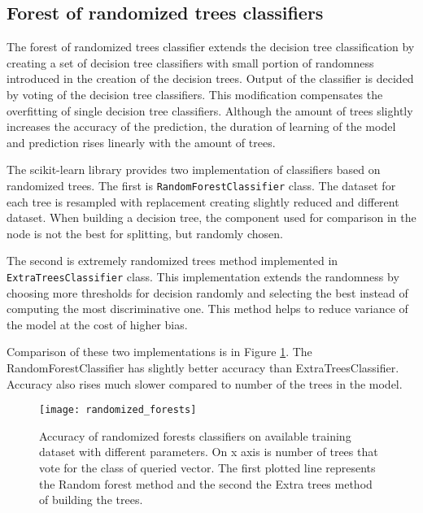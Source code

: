 \subsection{Forest of randomized trees classifiers}
The forest of randomized trees classifier extends the decision tree
classification by creating a set of decision tree classifiers with small portion
of randomness introduced in the creation of the decision trees. Output of the
classifier is decided by voting of the decision tree classifiers. This
modification compensates the overfitting of single decision tree classifiers.
Although the amount of trees slightly increases the accuracy of the prediction,
the duration of learning of the model and prediction rises linearly with the
amount of trees.

The scikit-learn library provides two implementation of classifiers based on
randomized trees. The first is \texttt{Random\-Forest\-Classifier} class. The
dataset for each tree is resampled with replacement creating slightly reduced
and different dataset. When building a decision tree, the component used for
comparison in the node is not the best for splitting, but randomly chosen.

The second is extremely randomized trees method implemented in
\texttt{Extra\-Trees\-Classifier} class. This implementation extends the randomness
by choosing more thresholds for decision randomly and selecting the best instead
of computing the most discriminative one. This method helps to reduce variance
of the model at the cost of higher bias.

Comparison of these two implementations is in Figure
\ref{fig:randomized_forests}. The RandomForestClassifier has slightly better
accuracy than ExtraTreesClassifier. Accuracy also rises much slower compared to
number of the trees in the model.

\begin{figure}
  \centering
  \texttt{[image: randomized\_forests]}
  \caption{Accuracy of randomized forests classifiers on available training
    dataset with different parameters. On x axis is number of trees that vote
    for the class of queried vector. The first plotted line represents the
    Random forest method and the second the Extra trees method of building the
    trees.}
  \label{fig:randomized_forests}
\end{figure}

